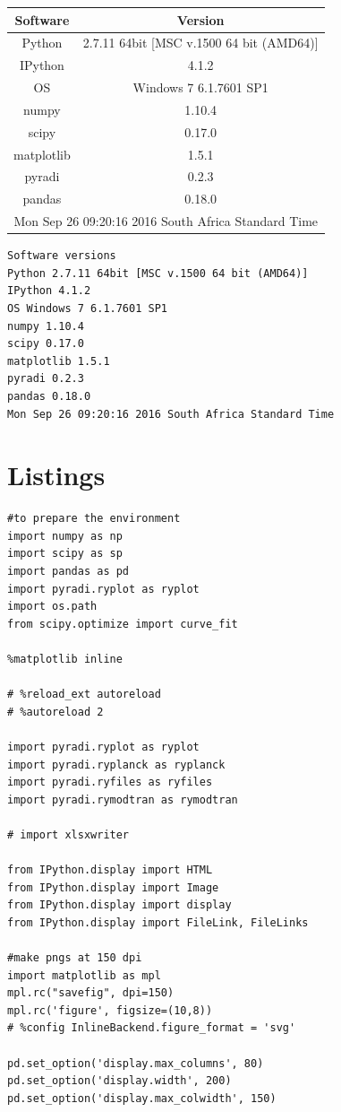 \documentclass{workpackage}
\begin{document}
\begin{center}

\begin{normalsize}

\begin{tabular}{|c|c|}
\hline
Software&Version\\\hline
Python&2.7.11 64bit [MSC v.1500 64 bit (AMD64)]\\\hline
IPython&4.1.2\\\hline
OS&Windows 7 6.1.7601 SP1\\\hline
numpy&1.10.4\\\hline
scipy&0.17.0\\\hline
matplotlib&1.5.1\\\hline
pyradi&0.2.3\\\hline
pandas&0.18.0\\\hline
\multicolumn{2}{|c|}{Mon Sep 26 09:20:16 2016 South Africa Standard Time}\\\hline

\end{tabular}
\end{normalsize}
\end{center}


\begin{lstlisting}[style=outcellstyle]
Software versions
Python 2.7.11 64bit [MSC v.1500 64 bit (AMD64)]
IPython 4.1.2
OS Windows 7 6.1.7601 SP1
numpy 1.10.4
scipy 0.17.0
matplotlib 1.5.1
pyradi 0.2.3
pandas 0.18.0
Mon Sep 26 09:20:16 2016 South Africa Standard Time
\end{lstlisting}



\chapter{Listings}


\begin{lstlisting}[style=incellstyle,caption={Code Listing in cell 10 \label{lst:autolistingcell10}}]
#to prepare the environment
import numpy as np
import scipy as sp
import pandas as pd
import pyradi.ryplot as ryplot
import os.path
from scipy.optimize import curve_fit

%matplotlib inline

# %reload_ext autoreload
# %autoreload 2

import pyradi.ryplot as ryplot
import pyradi.ryplanck as ryplanck
import pyradi.ryfiles as ryfiles
import pyradi.rymodtran as rymodtran

# import xlsxwriter

from IPython.display import HTML
from IPython.display import Image
from IPython.display import display
from IPython.display import FileLink, FileLinks

#make pngs at 150 dpi
import matplotlib as mpl
mpl.rc("savefig", dpi=150)
mpl.rc('figure', figsize=(10,8))
# %config InlineBackend.figure_format = 'svg'

pd.set_option('display.max_columns', 80)
pd.set_option('display.width', 200)
pd.set_option('display.max_colwidth', 150)


\end{lstlisting}
\end{document}
